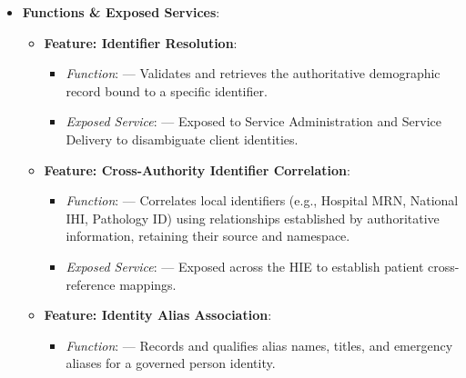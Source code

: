 \begin{itemize}
\begin{itemize}
\end{itemize}


\item
\textbf{Functions \& Exposed Services}:


\begin{itemize}

\item
\textbf{Feature: Identifier Resolution}:


\begin{itemize}

\item
\emph{Function}: \texttt{} — Validates and retrieves the authoritative demographic record bound to a specific identifier.



\item
\emph{Exposed Service}: \texttt{} — Exposed to Service Administration and Service Delivery to disambiguate client identities.



\end{itemize}


\item
\textbf{Feature: Cross-Authority Identifier Correlation}:


\begin{itemize}

\item
\emph{Function}: \texttt{} — Correlates local identifiers (e.g., Hospital MRN, National IHI, Pathology ID) using relationships established by authoritative information, retaining their source and namespace.



\item
\emph{Exposed Service}: \texttt{} — Exposed across the HIE to establish patient cross-reference mappings.



\end{itemize}


\item
\textbf{Feature: Identity Alias Association}:


\begin{itemize}

\item
\emph{Function}: \texttt{} — Records and qualifies alias names, titles, and emergency aliases for a governed person identity.




\end{itemize}
\end{itemize}
\end{itemize}
